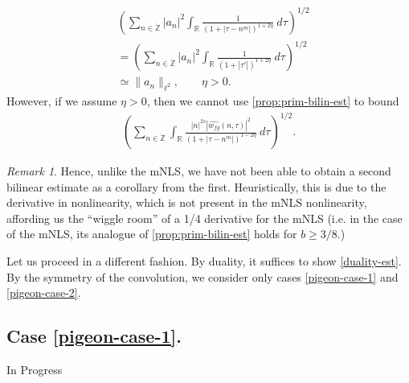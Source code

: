 \documentclass[12pt,reqno]{amsart}
\numberwithin{equation}{section}  %
\numberwithin{figure}{section}
\newcommand{\rr}{\mathbb{R}}
\newcommand{\zz}{\mathbb{Z}}
\newcommand{\ci}{\mathbb{T}}
\newcommand{\zzdot}{\dot{\zz}}
\newcommand{\wh}{\widehat}
\theoremstyle{plain}
\theoremstyle{definition}
\theoremstyle{remark}
\newtheorem{remark}{Remark}
\begin{document}
\begin{equation*}
	\begin{split}
		& \left( \sum_{n \in \zzdot} | a_{n} |^2\int_{\rr} \frac{1}{\left( 1 + | \tau -
		n^{m } | \right)^{1 + 2 \eta}} \ d \tau  
		\right)^{1/2} 
		\\
		& = \left ( \sum_{n \in \zzdot}
		| a_n |^2 
		\int_{\rr} \frac{1}{\left( 1 + | \tau' | \right)^{1 + 2 \eta}} \ d 
		\tau \right)^{1/2}
		\\
		& \simeq \|a_n\|_{\ell^2}, \qquad \eta >0.
		\end{split}
\end{equation*}
However, if we assume $\eta >0$, then
we cannot use \autoref{prop:prim-bilin-est} to bound
\begin{equation*}
	\begin{split}
		\left ( \sum_{n \in \zzdot}\int_{\rr} \frac{|n|^{2s} | \wh{w_{fg}}(n, \tau) 
		|^2}{\left( 1 + | \tau - n^{m } | \right)^{1 - 2\eta}}\ d \tau
		\right)^{1/2}. 
	\end{split}
\end{equation*}
\begin{remark}
Hence, unlike the mNLS, we have not been able to obtain a second bilinear
estimate as a corollary from the first. Heuristically, this is due to the
derivative in nonlinearity, which is not present in the mNLS nonlinearity,
affording us the ``wiggle room''  of a 1/4 derivative for the mNLS (i.e. in the case
of the mNLS, its analogue of \autoref{prop:prim-bilin-est} holds for $b \ge
3/8$.)
\end{remark}
%
%
Let us proceed in a different fashion. By duality, it suffices to show
\eqref{duality-est}. By the symmetry of the convolution, we consider only cases
\eqref{pigeon-case-1} and \eqref{pigeon-case-2}.
%
%
\subsection{Case \eqref{pigeon-case-1}.} In Progress
%
%
%
%
\end{document}
